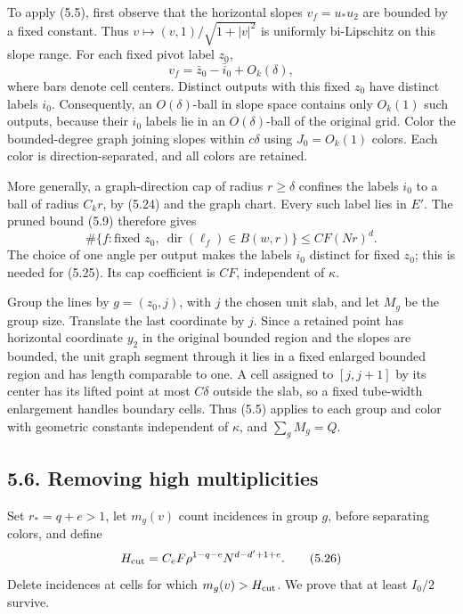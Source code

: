 \documentclass[
  11pt,
  a4paper,
]{article}
\begin{document}
To apply (5.5), first observe that the horizontal slopes \(v_f=u_*u_2\)
are bounded by a fixed constant. Thus \(v\mapsto(v,1)/\sqrt{1+|v|^2}\)
is uniformly bi-Lipschitz on this slope range. For each fixed pivot
label \(z_0\), \[
 v_f=\bar z_0-\bar i_0+O_k(\delta),               \tag{5.24}\label{eq:5.24}
\] where bars denote cell centers. Distinct outputs with this fixed
\(z_0\) have distinct labels \(i_0\). Consequently, an
\(O(\delta)\)-ball in slope space contains only \(O_k(1)\) such outputs,
because their \(i_0\) labels lie in an \(O(\delta)\)-ball of the
original grid. Color the bounded-degree graph joining slopes within
\(c\delta\) using \(J_0=O_k(1)\) colors. Each color is
direction-separated, and all colors are retained.

More generally, a graph-direction cap of radius \(r\ge\delta\) confines
the labels \(i_0\) to a ball of radius \(C_kr\), by (5.24) and the graph
chart. Every such label lies in \(E'\). The pruned bound (5.9) therefore
gives \[
 \#\{f:\text{fixed }z_0,\ \operatorname{dir}(\ell_f)\in B(w,r)\}
 \le C F(Nr)^d.                                   \tag{5.25}\label{eq:5.25}
\] The choice of one angle per output makes the labels \(i_0\) distinct
for fixed \(z_0\); this is needed for (5.25). Its cap coefficient is
\(CF\), independent of \(\kappa\).

Group the lines by \(g=(z_0,j)\), with \(j\) the chosen unit slab, and
let \(M_g\) be the group size. Translate the last coordinate by \(j\).
Since a retained point has horizontal coordinate \(y_2\) in the original
bounded region and the slopes are bounded, the unit graph segment
through it lies in a fixed enlarged bounded region and has length
comparable to one. A cell assigned to \([j,j+1]\) by its center has its
lifted point at most \(C\delta\) outside the slab, so a fixed tube-width
enlargement handles boundary cells. Thus (5.5) applies to each group and
color with geometric constants independent of \(\kappa\), and
\(\sum_gM_g=Q\).

\hypertarget{removing-high-multiplicities}{%
\subsection{5.6. Removing high
multiplicities}\label{removing-high-multiplicities}}

Set \(r_*=q+e>1\), let \(m_g(v)\) count incidences in group \(g\),
before separating colors, and define \[
 H_{\rm cut}=C_eF\rho^{1-q-e}N^{d-d'+1+e}.        \tag{5.26}\label{eq:5.26}
\] Delete incidences at cells for which \(m_g(v)>H_{\rm cut}\). We prove
that at least \(I_0/2\) survive.
\end{document}
